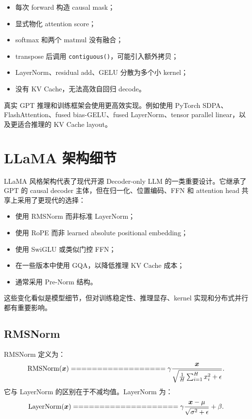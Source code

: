 \begin{itemize}
\item 每次 forward 构造 causal mask；
\item 显式物化 attention score；
\item softmax 和两个 matmul 没有融合；
\item transpose 后调用 \texttt{contiguous()}，可能引入额外拷贝；
\item LayerNorm、residual add、GELU 分散为多个小 kernel；
\item 没有 KV Cache，无法高效自回归 decode。
\end{itemize}

真实 GPT 推理和训练框架会使用更高效实现。例如使用 PyTorch SDPA、FlashAttention、fused bias-GELU、fused LayerNorm、tensor parallel linear，以及更适合推理的 KV Cache layout。

\section{LLaMA 架构细节}
\label{sec:llama-architecture-details}

LLaMA 风格架构代表了现代开源 Decoder-only LLM 的一类重要设计。它继承了 GPT 的 causal decoder 主体，但在归一化、位置编码、FFN 和 attention head 共享上采用了更现代的选择：

\begin{itemize}
\item 使用 RMSNorm 而非标准 LayerNorm；
\item 使用 RoPE 而非 learned absolute positional embedding；
\item 使用 SwiGLU 或类似门控 FFN；
\item 在一些版本中使用 GQA，以降低推理 KV Cache 成本；
\item 通常采用 Pre-Norm 结构。
\end{itemize}

这些变化看似是模型细节，但对训练稳定性、推理显存、kernel 实现和分布式并行都有重要影响。

\subsection{RMSNorm}
\label{subsec:llama-rmsnorm}

RMSNorm 定义为：
\[
\RMSNorm(\vect{x})
==================

\gamma
\frac{\vect{x}}
{\sqrt{
\frac{1}{H}\sum_{i=1}^{H}x_i^2+\epsilon
}}.
\]
它与 LayerNorm 的区别在于不减均值。LayerNorm 为：
\[
\LayerNorm(\vect{x})
====================

\gamma
\frac{\vect{x}-\mu}
{\sqrt{\sigma^2+\epsilon}}
+
\beta.
\]

